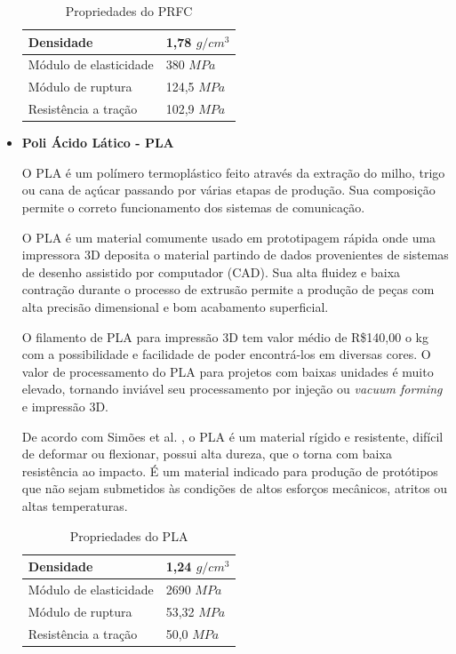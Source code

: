 \begin{itemize}
    \begin{table}[h]
\centering
\begin{tabular}{|l|l|}
\hline
Densidade              & 1,78 $g/cm^3$ \\ \hline
Módulo de elasticidade & 380 $MPa$ \\ \hline
Módulo de ruptura      & 124,5 $MPa$ \\ \hline
Resistência a tração   & 102,9 $MPa$ \\ \hline
\end{tabular}
\caption{Propriedades do PRFC}
\label{tab:PRFC}
\end{table}
    
    \item \textbf{Poli Ácido Lático - PLA}
    
    \par O PLA é um polímero termoplástico feito através da extração do milho, trigo ou cana de açúcar passando por várias etapas de produção. Sua composição permite o correto funcionamento dos sistemas de comunicação. 
    
	\par O PLA é um material comumente usado em prototipagem rápida onde uma impressora 3D deposita o material partindo de dados provenientes de sistemas de desenho assistido por computador (CAD). Sua alta ﬂuidez e baixa contração durante o processo de extrusão permite a produção de peças com alta precisão dimensional e bom acabamento superﬁcial.
	
	\par O filamento de PLA para impressão 3D tem valor médio de R\$140,00 o kg com a possibilidade e facilidade de poder encontrá-los em diversas cores. O valor de processamento do PLA para projetos com baixas unidades é muito elevado, tornando inviável seu processamento por injeção ou \textit{vacuum forming} e impressão 3D. 
	
	\par De acordo com Simões et al. \cite{simoes2009mechanical}, o PLA é um material rígido e resistente, difícil de deformar ou ﬂexionar, possui alta dureza, que o torna com baixa resistência ao impacto. É um material indicado para produção de protótipos que não sejam submetidos às condições de altos esforços mecânicos, atritos ou altas temperaturas.


    \begin{table}[h]
\centering
\begin{tabular}{|l|l|}
\hline
Densidade              & 1,24 $g/cm^3$ \\ \hline
Módulo de elasticidade & 2690 $MPa$ \\ \hline
Módulo de ruptura      & 53,32 $MPa$ \\ \hline
Resistência a tração   & 50,0 $MPa$ \\ \hline
\end{tabular}
\caption{Propriedades do PLA}
\label{tab:PLA}
\end{table}


\end{itemize}
